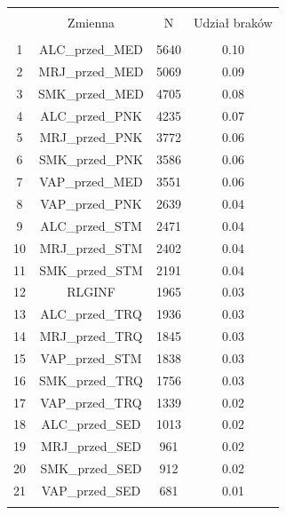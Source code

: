 
\begin{tabular}{@{\extracolsep{5pt}} cccc} 
\\[-1.8ex]\hline 
\hline \\[-1.8ex] 
 & Zmienna & N & Udział braków \\ 
\hline \\[-1.8ex] 
1 & ALC\_przed\_MED & 5640 & 0.10 \\ 
2 & MRJ\_przed\_MED & 5069 & 0.09 \\ 
3 & SMK\_przed\_MED & 4705 & 0.08 \\ 
4 & ALC\_przed\_PNK & 4235 & 0.07 \\ 
5 & MRJ\_przed\_PNK & 3772 & 0.06 \\ 
6 & SMK\_przed\_PNK & 3586 & 0.06 \\ 
7 & VAP\_przed\_MED & 3551 & 0.06 \\ 
8 & VAP\_przed\_PNK & 2639 & 0.04 \\ 
9 & ALC\_przed\_STM & 2471 & 0.04 \\ 
10 & MRJ\_przed\_STM & 2402 & 0.04 \\ 
11 & SMK\_przed\_STM & 2191 & 0.04 \\ 
12 & RLGINF & 1965 & 0.03 \\ 
13 & ALC\_przed\_TRQ & 1936 & 0.03 \\ 
14 & MRJ\_przed\_TRQ & 1845 & 0.03 \\ 
15 & VAP\_przed\_STM & 1838 & 0.03 \\ 
16 & SMK\_przed\_TRQ & 1756 & 0.03 \\ 
17 & VAP\_przed\_TRQ & 1339 & 0.02 \\ 
18 & ALC\_przed\_SED & 1013 & 0.02 \\ 
19 & MRJ\_przed\_SED & 961 & 0.02 \\ 
20 & SMK\_przed\_SED & 912 & 0.02 \\ 
21 & VAP\_przed\_SED & 681 & 0.01 \\ 
\hline \\[-1.8ex] 
\end{tabular} 
